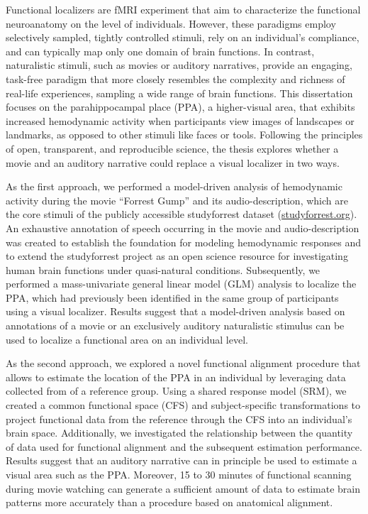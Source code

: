 Functional localizers are fMRI experiment that aim to characterize the
functional neuroanatomy on the level of individuals.
%
However, these paradigms employ selectively sampled, tightly controlled
stimuli, rely on an individual's compliance, and can typically map only one
domain of brain functions.
In contrast, naturalistic stimuli, such as movies or auditory narratives,
provide an engaging, task-free paradigm that more closely resembles the
complexity and richness of real-life experiences, sampling a wide range of
brain functions.
This dissertation focuses on the parahippocampal place (PPA), a higher-visual
area, that exhibits increased hemodynamic activity when participants view
images of landscapes or landmarks, as opposed to other stimuli like faces or
tools.
Following the principles of open, transparent, and reproducible science, the
thesis explores whether a movie and an auditory narrative could replace a
visual localizer in two ways.

As the first approach, we performed a model-driven analysis of hemodynamic
activity during the movie ``Forrest Gump'' and its audio-description, which are
the core stimuli of the publicly accessible studyforrest dataset
(\href{www.studyforrest.org}{\url{studyforrest.org}}).
%
An exhaustive annotation of speech occurring in the movie and audio-description
was created to establish the foundation for modeling hemodynamic responses and
to extend the studyforrest project as an open science resource for
investigating human brain functions under quasi-natural conditions.
Subsequently, we performed a mass-univariate general linear model (GLM)
analysis to localize the PPA, which had previously been identified in the same
group of participants using a visual localizer.
Results suggest that a model-driven analysis based on annotations of a movie or
an exclusively auditory naturalistic stimulus can be used to localize a
functional area on an individual level.

As the second approach, we explored a novel functional alignment procedure that
allows to estimate the location of the PPA in an individual by leveraging data
collected from of a reference group.
%
Using a shared response model (SRM), we created a common functional space (CFS)
and subject-specific transformations to project functional data from the
reference through the CFS into an individual's brain space.
%
Additionally, we investigated the relationship between the quantity of data used
for functional alignment and the subsequent estimation performance.
%
Results suggest that an auditory narrative can in principle be used to estimate
a visual area such as the PPA.
%
Moreover, 15 to 30 minutes of functional scanning during movie watching can
generate a sufficient amount of data to estimate brain patterns
more accurately than a procedure based on anatomical alignment.

